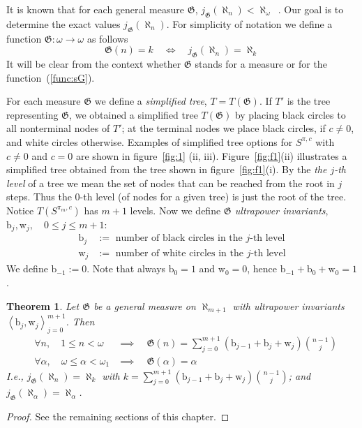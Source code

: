 \documentclass[bibother]{asl}
\newtheorem{thm}{Theorem}[section]
\theoremstyle{definition}
\theoremstyle{remark}
\newcommand{\ib}{\textrm{b}}
\newcommand{\iw}{\textrm{w}}
\newcommand{\om}{\omega}
\newcommand{\al}[1]{{\aleph_{#1}}}
\newcommand{\sG}{\mathfrak{G}}
\begin{document}
It is known that for each general measure $\sG$, $j_\sG(\al{n})<\al{\om}$~\cite{Ke2}.
Our goal is to determine the exact values $j_\sG(\al{n})$.
For simplicity of notation we define a function $\sG:\om\to\om$ as follows
\begin{equation}\label{func:sG}
\sG(n)=k\quad\iff\quad j_\sG(\al{n})=\al{k}
\end{equation}
It will be clear from the context whether $\sG$ stands for a measure or for the function~(\ref{func:sG}).

For each measure $\sG$ we define a {\em simplified tree}, $T=T(\sG)$. If $T'$ is the tree representing $\sG$,
we obtained a simplified tree $T(\sG)$ by placing black circles to all nonterminal nodes of $T'$; at the terminal 
nodes we place black circles, if $c\ne 0$, and white circles otherwise.
Examples of simplified tree options for $S^{\pi,c}$ with $c\ne 0$ and $c=0$ are shown in figure~\ref{fig:1} (ii, iii).
Figure~\ref{fig:f1}(ii) illustrates a simplified tree obtained from the tree shown in figure~\ref{fig:f1}(i).
By the {\em the $j$-th level} of a tree we mean the set of nodes that can be reached from the root in $j$ steps.
Thus the $0$-th level (of nodes for a given tree) is just the root of the tree.
Notice $T(S^{\pi_m,c})$ has $m+1$ levels.
Now we define {\em $\sG$ ultrapower invariants}, $\ib_j, \iw_j, \quad 0\le j\le m+1$:
\begin{eqnarray}
     \ib_j & := \textrm{ number of black circles in the $j$-th level}\\
     \iw_j & := \textrm{ number of white circles in the $j$-th level}
\end{eqnarray}
We define $\ib_{-1}:=0$. Note that always $\ib_0=1$ and $\iw_0=0$, hence $\ib_{-1}+\ib_0+\iw_0=1$.

\begin{thm}\label{thm:1}
Let $\sG$ be a general measure on $\al{m+1}$ with ultrapower invariants
$\left\langle \ib_j, \iw_j \right\rangle_{j=0}^{m+1} $. 
Then 
\begin{eqnarray}
&\forall n,\quad 1\le n < \om & \implies \quad
\sG(n) = \sum_{j=0}^{m+1} (\ib_{j-1}+\ib_j+\iw_j)  {n-1 \choose j} \\
%
&\forall\alpha, \quad \om\le \alpha<\om_1 & \implies \quad \sG(\alpha)=\alpha
\end{eqnarray}
I.e., $j_\sG(\al{n})=\al{k}$ with 
$k=\sum_{j=0}^{m+1} (\ib_{j-1}+\ib_j+\iw_j)  {n-1 \choose j}$;
and  $j_\sG(\al{\alpha})=\al{\alpha}$.
\end{thm}
\begin{proof} See the remaining sections of this chapter.
\end{proof}
\end{document}
